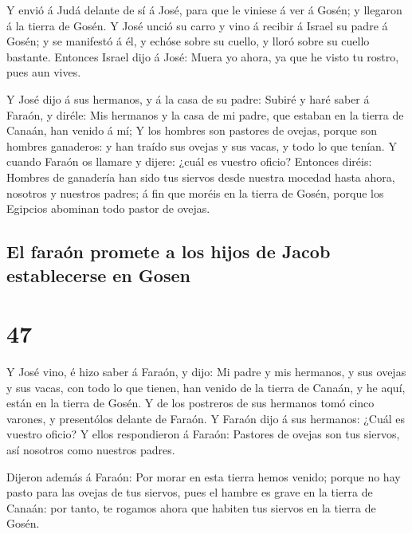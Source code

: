  Y envió á Judá delante de sí á José, para que le viniese
á ver á Gosén; y llegaron á la tierra de Gosén.  Y José
unció su carro y vino á recibir á Israel su padre á Gosén; y se
manifestó á él, y echóse sobre su cuello, y lloró sobre su cuello
bastante.  Entonces Israel dijo á José: Muera yo ahora,
ya que he visto tu rostro, pues aun vives.

 Y José dijo á sus hermanos, y á la casa de su padre:
Subiré y haré saber á Faraón, y diréle: Mis hermanos y la casa de mi
padre, que estaban en la tierra de Canaán, han venido á mí;
 Y los hombres son pastores de ovejas, porque son hombres
ganaderos: y han traído sus ovejas y sus vacas, y todo lo que tenían.
 Y cuando Faraón os llamare y dijere: ¿cuál es vuestro
oficio?  Entonces diréis: Hombres de ganadería han sido
tus siervos desde nuestra mocedad hasta ahora, nosotros y nuestros
padres; á fin que moréis en la tierra de Gosén, porque los Egipcios
abominan todo pastor de ovejas.

\hypertarget{el-farauxf3n-promete-a-los-hijos-de-jacob-establecerse-en-gosen}{%
\subsection{El faraón promete a los hijos de Jacob establecerse en
Gosen}\label{el-farauxf3n-promete-a-los-hijos-de-jacob-establecerse-en-gosen}}

\hypertarget{section-01-47}{%
\section{47}\label{section-01-47}}

 Y José vino, é hizo saber á Faraón, y dijo: Mi padre y
mis hermanos, y sus ovejas y sus vacas, con todo lo que tienen, han
venido de la tierra de Canaán, y he aquí, están en la tierra de Gosén.
 Y de los postreros de sus hermanos tomó cinco varones, y
presentólos delante de Faraón.  Y Faraón dijo á sus
hermanos: ¿Cuál es vuestro oficio? Y ellos respondieron á Faraón:
Pastores de ovejas son tus siervos, así nosotros como nuestros padres.

 Dijeron además á Faraón: Por morar en esta tierra hemos
venido; porque no hay pasto para las ovejas de tus siervos, pues el
hambre es grave en la tierra de Canaán: por tanto, te rogamos ahora que
habiten tus siervos en la tierra de Gosén.

